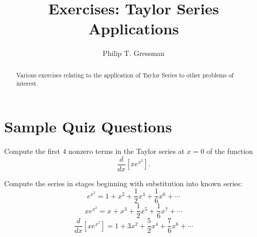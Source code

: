 \documentclass{ximera}
\title{Exercises: Taylor Series Applications}
\author{Philip T. Gressman}
\begin{document}
\begin{abstract}
Various exercises relating to the application of Taylor Series to other problems of interest.
\end{abstract}
\maketitle

\section*{Sample Quiz Questions}

\begin{question}%

Compute the first \(4\) nonzero terms in the Taylor series 
at \(x=0\) of the function \[\frac{d}{dx} \left[ x e^{x^2} \right].\]
\begin{multiplechoice}
\end{multiplechoice}
\begin{feedback}
Compute the series in stages beginning with substitution into known series:
\[e^{x^2} = 1 + x^{2} + \frac{1}{2}x^{4} + \frac{1}{6}x^{6} + \cdots \]
\[x e^{x^2} = x + x^{3} + \frac{1}{2}x^{5} + \frac{1}{6}x^{7} + \cdots \]
\[\frac{d}{dx} \left[ x e^{x^2} \right] = 1 + 3x^{2} + \frac{5}{2}x^{4} + \frac{7}{6}x^{6} + \cdots \]
\end{feedback}

\end{question}
\end{document}

